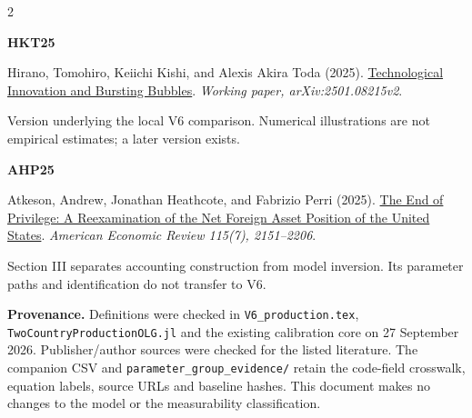 \documentclass[10pt,a4paper,landscape]{article}
\newcommand{\code}[1]{{\footnotesize\texttt{#1}}}
\begin{document}
\begin{multicols}{2}
\noindent\begin{minipage}{\linewidth}\raggedright\hypertarget{ref:HKT}{\textbf{HKT25}} Hirano, Tomohiro, Keiichi Kishi, and Alexis Akira Toda (2025). \href{https://arxiv.org/abs/2501.08215v2}{Technological Innovation and Bursting Bubbles}. \emph{Working paper, arXiv:2501.08215v2}.\par Version underlying the local V6 comparison. Numerical illustrations are not empirical estimates; a later version exists.\end{minipage}\par\vspace{6pt}
\noindent\begin{minipage}{\linewidth}\raggedright\hypertarget{ref:AHP}{\textbf{AHP25}} Atkeson, Andrew, Jonathan Heathcote, and Fabrizio Perri (2025). \href{https://doi.org/10.1257/aer.20230732}{The End of Privilege: A Reexamination of the Net Foreign Asset Position of the United States}. \emph{American Economic Review 115(7), 2151--2206}.\par Section III separates accounting construction from model inversion. Its parameter paths and identification do not transfer to V6.\end{minipage}\par\vspace{6pt}
\end{multicols}
\small\textbf{Provenance.} Definitions were checked in \code{V6\_production.tex}, \code{TwoCountryProductionOLG.jl} and the existing calibration core on 27 September 2026. Publisher/author sources were checked for the listed literature. The companion CSV and \code{parameter\_group\_evidence/} retain the code-field crosswalk, equation labels, source URLs and baseline hashes. This document makes no changes to the model or the measurability classification.
\end{document}
